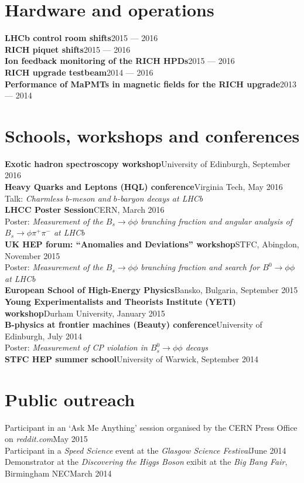 \documentclass{simplecv}
\newcommand\dateditem[2]{#1\hfill#2\\}
\newcommand\topictitle[3]{\dateditem{{\textbf{#1}}}{#3}#2}
\begin{document}
	\section{Hardware and operations}
	\topictitle{LHCb control room shifts}{}{2015 --- 2016}
	\topictitle{RICH piquet shifts}{}{2015 --- 2016}
	\topictitle{Ion feedback monitoring of the RICH HPDs}{}{2015 --- 2016}
	\topictitle{RICH upgrade testbeam}{}{2014 --- 2016}
	\topictitle{Performance of MaPMTs in magnetic fields for the RICH upgrade}{}{2013 --- 2014}
	\section{Schools, workshops and conferences}
	\topictitle{Exotic hadron spectroscopy workshop}{}{University of Edinburgh, September 2016}[0.5em]
	\topictitle{Heavy Quarks and Leptons (HQL) conference}{Talk: \textit{Charmless $b$-meson and $b$-baryon decays at LHCb}}{Virginia Tech, May 2016}\\[0.5em]
	\topictitle{LHCC Poster Session}{Poster: \textit{Measurement of the $B_s \to \phi \phi$ branching fraction and angular analysis of $B_s \to \phi \pi^{+} \pi^{-}$ at LHCb}}{CERN, March 2016}\\[0.5em]
	\topictitle{UK HEP forum: ``Anomalies and Deviations'' workshop}{Poster: \textit{Measurement of the $B_s \to \phi \phi$ branching fraction and search for $B^0 \to \phi \phi$ at LHCb}}{STFC, Abingdon, November 2015}\\[0.5em]
	\topictitle{European School of High-Energy Physics}{}{Bansko, Bulgaria, September 2015}[0.5em]
	\topictitle{Young Experimentalists and Theorists Institute (YETI) workshop}{}{Durham University, January 2015}[0.5em]
	\topictitle{B-physics at frontier machines (Beauty) conference}{Poster: \textit{Measurement of CP violation in $B^0_s \to \phi\phi$ decays}}{University of Edinburgh, July 2014}\\[0.5em]
	\topictitle{STFC HEP summer school}{}{University of Warwick, September 2014}[0.5em]
	\section{Public outreach}
	\dateditem{Participant in an `Ask Me Anything' session organised by the CERN Press Office on \textit{reddit.com}}{May 2015}
	\dateditem{Participant in a \textit{Speed Science} event at the \textit{Glasgow Science Festival}}{June 2014}
	\dateditem{Demonstrator at the \textit{Discovering the Higgs Boson} exibit at the \textit{Big Bang Fair}, Birmingham NEC}{March 2014}
\end{document}
